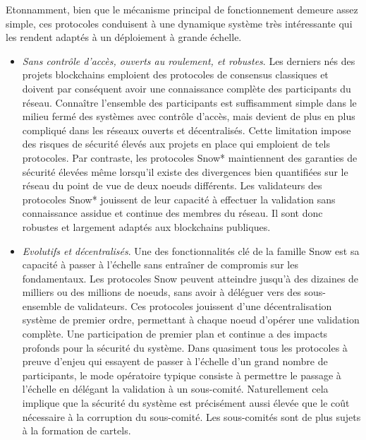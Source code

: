 \documentclass[runningheads]{llncs}
\begin{document}
Etonnamment, bien que le mécanisme principal de fonctionnement demeure assez simple, ces protocoles conduisent à une
dynamique système très intéressante qui les rendent adaptés à un déploiement à grande échelle.
\begin{itemize}
\item \textit{Sans contrôle d'accès, ouverts au roulement, et robustes}. Les derniers nés des projets blockchains
emploient des protocoles de consensus classiques et doivent par conséquent avoir une connaissance complète des
participants du réseau. Connaître l'ensemble des participants est suffisamment simple dans le milieu fermé des systèmes
avec contrôle d'accès, mais devient de plus en plus compliqué dans les réseaux ouverts et décentralisés. Cette
limitation impose des risques de sécurité élevés aux projets en place qui emploient de tels protocoles. Par
contraste, les protocoles Snow* maintiennent des garanties de sécurité élevées même lorsqu'il existe des divergences
bien quantifiées sur le réseau du point de vue de deux noeuds différents. Les validateurs des protocoles Snow* jouissent
de leur capacité à effectuer la validation sans connaissance assidue et continue des membres du réseau. Il sont donc
robustes et largement adaptés aux blockchains publiques.
\item \textit{Evolutifs et décentralisés}. Une des fonctionnalités clé de la famille Snow est sa capacité à passer à
l'échelle sans entraîner de compromis sur les fondamentaux. Les protocoles Snow peuvent atteindre jusqu'à des dizaines
de milliers ou des millions de noeuds, sans avoir à déléguer vers des sous-ensemble de validateurs. Ces protocoles
jouissent d'une décentralisation système de premier ordre, permettant à chaque noeud d'opérer une validation complète.
Une participation de premier plan et continue a des impacts profonds pour la sécurité du système. Dans quasiment tous
les protocoles à preuve d'enjeu qui essayent de passer à l'échelle d'un grand nombre de participants, le mode opératoire
typique consiste à permettre le passage à l'échelle en délégant la validation à un sous-comité. Naturellement cela
implique que la sécurité du système est précisément aussi élevée que le coût nécessaire à la corruption du sous-comité.
Les sous-comités sont de plus sujets à la formation de cartels.


\end{itemize}
\end{document}

